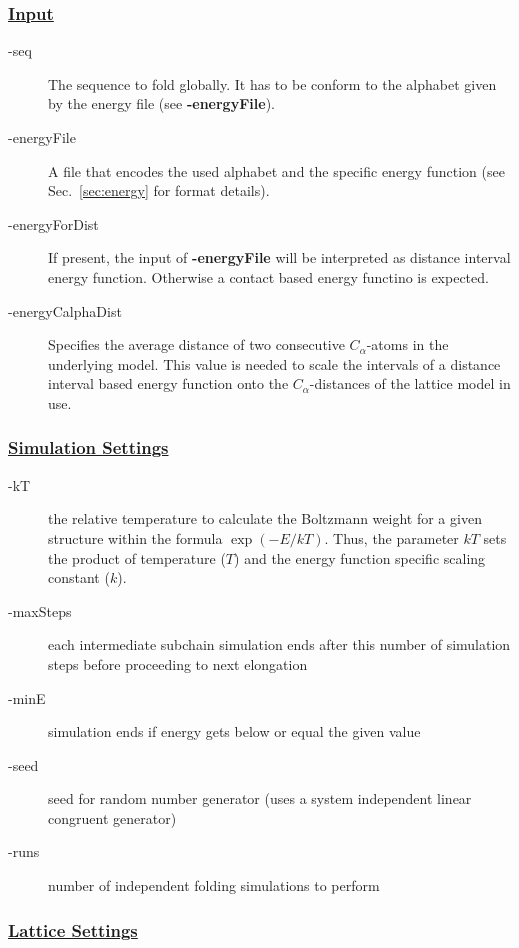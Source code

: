 \documentclass{article}
\begin{document}
\subsubsection*{\underline{ Input }}

\begin{description}
	\item[-seq] The sequence to fold globally. It has to be conform
	to the alphabet given by the energy file (see {\bfseries -energyFile}).
	\item[-energyFile] A file that encodes the used alphabet and the
	specific energy function (see Sec.~\ref{sec:energy} for format details).
	\item[-energyForDist] If present, the input of {\bfseries -energyFile} will be
	interpreted as distance interval energy function. Otherwise a contact based
	energy functino is expected.
	\item[-energyCalphaDist] Specifies the average distance of two
	consecutive $C_\alpha$-atoms in the underlying model. This value is needed to
	scale the intervals of a distance interval based energy function onto the
	$C_\alpha$-distances of the lattice model in use.
\end{description}

\subsubsection*{\underline{ Simulation Settings }} 

\begin{description}
	\item[-kT] the relative temperature to calculate the Boltzmann weight for a
	given structure within the formula $\exp(-E/kT)$. Thus, the parameter $kT$ 
	sets the product of temperature ($T$) and the energy function specific scaling
	constant ($k$).
	\item[-maxSteps] each intermediate subchain simulation ends after this number
	of simulation steps before proceeding to next elongation
 	\item[-minE] simulation ends if energy gets below or equal the given value
 	\item[-seed] seed for random number generator (uses a system
        independent linear congruent generator)
 	\item[-runs] number of independent folding simulations to perform
\end{description}

\subsubsection*{\underline{ Lattice Settings }} \label{sec:lat-params}
\end{document}
